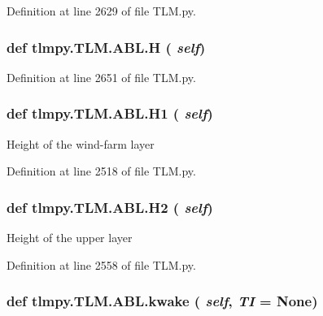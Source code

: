 Definition at line 2629 of file TLM.py.\hypertarget{classtlmpy_1_1TLM_1_1ABL_adc9a916c8851240b1df4aedcf20ba085}{
\subsubsection[{H}]{\setlength{\rightskip}{0pt plus 5cm}def tlmpy.TLM.ABL.H ( {\em self})}}
\label{classtlmpy_1_1TLM_1_1ABL_adc9a916c8851240b1df4aedcf20ba085}


Definition at line 2651 of file TLM.py.\hypertarget{classtlmpy_1_1TLM_1_1ABL_acc7da120ea40b7c8d2b990a59f78de15}{
\subsubsection[{H1}]{\setlength{\rightskip}{0pt plus 5cm}def tlmpy.TLM.ABL.H1 ( {\em self})}}
\label{classtlmpy_1_1TLM_1_1ABL_acc7da120ea40b7c8d2b990a59f78de15}
\begin{DoxyVerb}Height of the wind-farm layer\end{DoxyVerb}
 

Definition at line 2518 of file TLM.py.\hypertarget{classtlmpy_1_1TLM_1_1ABL_a9d868a8acb621d9fb08a40a2cb991841}{
\subsubsection[{H2}]{\setlength{\rightskip}{0pt plus 5cm}def tlmpy.TLM.ABL.H2 ( {\em self})}}
\label{classtlmpy_1_1TLM_1_1ABL_a9d868a8acb621d9fb08a40a2cb991841}
\begin{DoxyVerb}Height of the upper layer\end{DoxyVerb}
 

Definition at line 2558 of file TLM.py.\hypertarget{classtlmpy_1_1TLM_1_1ABL_aa581681181753fd8f76fcaf5a4f57cc5}{
\subsubsection[{kwake}]{\setlength{\rightskip}{0pt plus 5cm}def tlmpy.TLM.ABL.kwake ( {\em self}, \/   {\em TI} = {\ttfamily None})}}
\label{classtlmpy_1_1TLM_1_1ABL_aa581681181753fd8f76fcaf5a4f57cc5}


